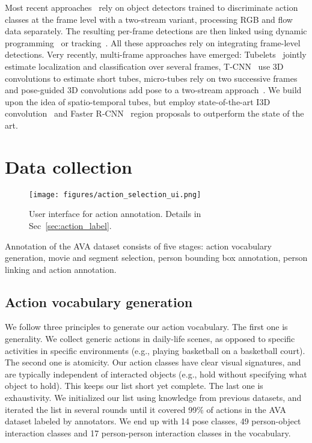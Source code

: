\documentclass[10pt,twocolumn,letterpaper]{article}
\begin{document}
Most recent approaches~\cite{gkioxari2015,peng2016multi,saha2016,weinzaepfel2015} rely on object detectors trained to discriminate action classes at the frame level with a two-stream variant, processing RGB and flow data separately. The resulting per-frame detections are then linked using dynamic programming~\cite{gkioxari2015,Singh_ICCV2017} or tracking~\cite{weinzaepfel2015}. All these approaches rely on integrating frame-level detections. Very recently, multi-frame approaches have emerged: Tubelets~\cite{tubelets_iccv17} jointly estimate localization and classification over several frames, T-CNN~\cite{T_CNN_iccv17} use 3D convolutions to estimate short tubes, micro-tubes rely on two successive frames~\cite{micro_tube2017} and pose-guided 3D convolutions add pose to a two-stream approach~\cite{pose_brox2017}. We build upon the idea of spatio-temporal tubes, but employ state-of-the-art I3D convolution~\cite{i3d_cvpr17} and Faster R-CNN~\cite{ren2015faster} region proposals to outperform the state of the art.
\vspace{-0.8em} 
\section{Data collection}
\label{sec:collection}

\begin{figure}[t]
\centerline{\texttt{[image: figures/action\_selection\_ui.png]}}
\caption{User interface for action annotation. Details in Sec~\ref{sec:action_label}.}
\label{fig:annotation}
\vspace{-1em}
\end{figure}

Annotation of the AVA dataset consists of five stages: action vocabulary generation, movie and segment selection, person bounding box annotation, person linking and action annotation.

\subsection{Action vocabulary generation}

We follow three principles to generate our action vocabulary. The first one is generality. We collect generic actions in daily-life scenes, as opposed to specific activities in specific environments (e.g., playing basketball on a basketball court). The second one is atomicity. Our action classes have clear visual signatures, and are typically independent of interacted objects (e.g., hold without specifying what object to hold). This keeps our list short yet complete. The last one is exhaustivity. We initialized our list using knowledge from previous datasets, and iterated the list in several rounds until it covered 99\% of actions in the AVA dataset labeled by annotators. We end up with 14 pose classes, 49 person-object interaction classes and 17 person-person interaction classes in the vocabulary.
\end{document}
